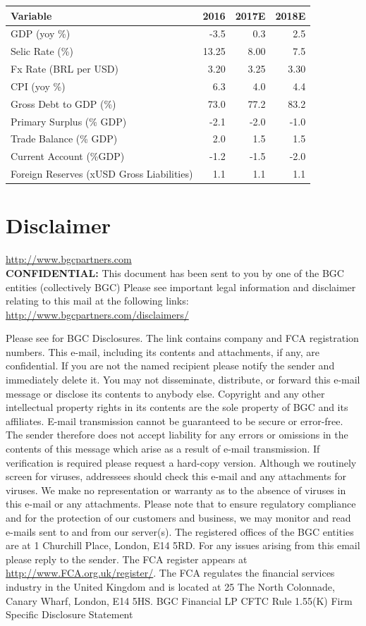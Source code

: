 \documentclass{report}
\begin{document}
\begin{center}
\begin{tabular}{lrrr}
\hline
\textbf{Variable} & \textbf{2016} & \textbf{2017E} & \textbf{2018E}\\
\hline
\hline
GDP (yoy \%) & -3.5 & 0.3 & 2.5\\
Selic Rate (\%) & 13.25 & 8.00 & 7.5\\
Fx Rate (BRL per USD) & 3.20 & 3.25 & 3.30\\
CPI (yoy \%) & 6.3 & 4.0 & 4.4\\
Gross Debt to GDP (\%) & 73.0 & 77.2 & 83.2\\
Primary Surplus (\% GDP) & -2.1 & -2.0 & -1.0\\
Trade Balance (\% GDP) & 2.0 & 1.5 & 1.5\\
Current Account (\%GDP) & -1.2 & -1.5 & -2.0\\
Foreign Reserves (xUSD Gross Liabilities) & 1.1 & 1.1 & 1.1\\
\hline
\end{tabular}
\end{center}
\newpage


\section{Disclaimer}
\label{sec:org718fe4d}
\url{http://www.bgcpartners.com} \\
\textbf{CONFIDENTIAL:} This document has been sent to you by one of
the BGC entities (collectively BGC) Please see important legal
information and disclaimer relating to this mail at the following
links: \url{http://www.bgcpartners.com/disclaimers/}

Please see for BGC Disclosures. The link contains company and FCA
registration numbers. This e-mail, including its contents and
attachments, if any, are confidential. If you are not the named
recipient please notify the sender and immediately delete it. You may
not disseminate, distribute, or forward this e-mail message or
disclose its contents to anybody else. Copyright and any other
intellectual property rights in its contents are the sole property of
BGC and its affiliates. E-mail transmission cannot be guaranteed to be
secure or error-free.  The sender therefore does not accept liability
for any errors or omissions in the contents of this message which
arise as a result of e-mail transmission.  If verification is required
please request a hard-copy version. Although we routinely screen for
viruses, addressees should check this e-mail and any attachments for
viruses. We make no representation or warranty as to the absence of
viruses in this e-mail or any attachments. Please note that to ensure
regulatory compliance and for the protection of our customers and
business, we may monitor and read e-mails sent to and from our
server(s).  The registered offices of the BGC entities are at 1
Churchill Place, London, E14 5RD.  For any issues arising from this
email please reply to the sender.  The FCA register appears at
\url{http://www.FCA.org.uk/register/}.  The FCA regulates the financial
services industry in the United Kingdom and is located at 25 The North
Colonnade, Canary Wharf, London, E14 5HS.  BGC Financial LP CFTC Rule
1.55(K) Firm Specific Disclosure Statement
\end{document}
